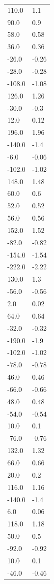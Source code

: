 \begin{longtable}{ll}
110.0 & 1.1 \\
90.0 & 0.9 \\
58.0 & 0.58 \\
36.0 & 0.36 \\
-26.0 & -0.26 \\
-28.0 & -0.28 \\
-108.0 & -1.08 \\
126.0 & 1.26 \\
-30.0 & -0.3 \\
12.0 & 0.12 \\
196.0 & 1.96 \\
-140.0 & -1.4 \\
-6.0 & -0.06 \\
-102.0 & -1.02 \\
148.0 & 1.48 \\
60.0 & 0.6 \\
52.0 & 0.52 \\
56.0 & 0.56 \\
152.0 & 1.52 \\
-82.0 & -0.82 \\
-154.0 & -1.54 \\
-222.0 & -2.22 \\
130.0 & 1.3 \\
-56.0 & -0.56 \\
2.0 & 0.02 \\
64.0 & 0.64 \\
-32.0 & -0.32 \\
-190.0 & -1.9 \\
-102.0 & -1.02 \\
-78.0 & -0.78 \\
46.0 & 0.46 \\
-66.0 & -0.66 \\
48.0 & 0.48 \\
-54.0 & -0.54 \\
10.0 & 0.1 \\
-76.0 & -0.76 \\
132.0 & 1.32 \\
66.0 & 0.66 \\
20.0 & 0.2 \\
116.0 & 1.16 \\
-140.0 & -1.4 \\
6.0 & 0.06 \\
118.0 & 1.18 \\
50.0 & 0.5 \\
-92.0 & -0.92 \\
10.0 & 0.1 \\
-46.0 & -0.46 \\

\end{longtable}
